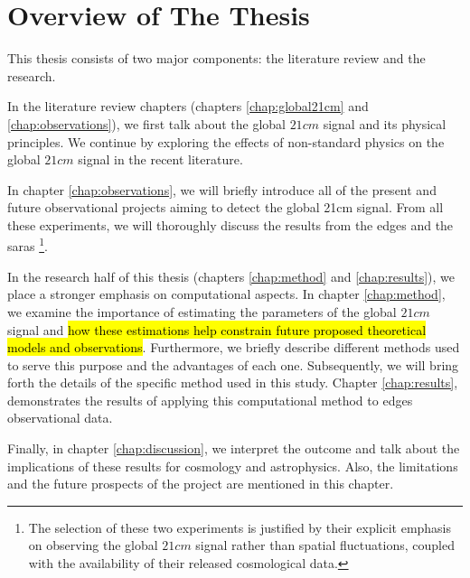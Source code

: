 \documentclass[12pt, TexShade, letterpaper]{report}
\begin{document}
\section{Overview of The Thesis}
This thesis consists of two major components: the literature review and the research.\par
In the literature review chapters (chapters \ref{chap:global21cm} and \ref{chap:observations}), we first talk about the global $21cm$ signal and its physical principles. We continue by exploring the effects of non-standard physics on the global $21cm$ signal in the recent literature. \par
In chapter \ref{chap:observations}, we will briefly introduce all of the present and future observational projects aiming to detect the global 21cm signal. From all these experiments, we will thoroughly discuss the results from the \gls{edges} \cite{edges} and the \gls{saras} \cite{saras_1} \footnote{The selection of these two experiments is justified by their explicit emphasis on observing the global $21cm$ signal rather than spatial fluctuations, coupled with the availability of their released cosmological data.}.\par
In the research half of this thesis (chapters \ref{chap:method} and \ref{chap:results}), we place a stronger emphasis on computational aspects. 
In chapter \ref{chap:method}, we examine the importance of estimating the parameters of the global $21cm$ signal and \hl{how these estimations help constrain future proposed theoretical models and observations}. Furthermore, we briefly describe different methods used to serve this purpose and the advantages of each one.
Subsequently, we will bring forth the details of the specific method used in this study. 
Chapter \ref{chap:results}, demonstrates the results of applying this computational method to \gls{edges} observational data.\par

Finally, in chapter \ref{chap:discussion}, we interpret the outcome and talk about the implications of these results for cosmology and astrophysics. Also, the limitations and the future prospects of the project are mentioned in this chapter.\par
\end{document}
